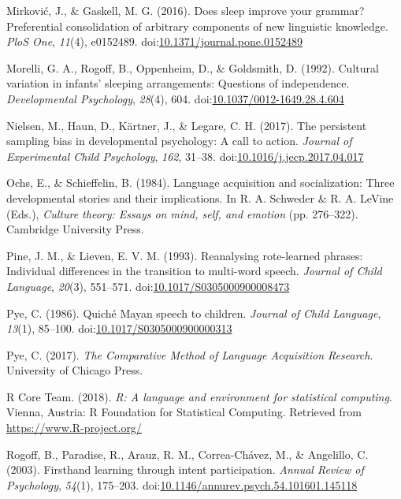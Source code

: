 \documentclass[floatsintext,man]{apa6}
\theoremstyle{definition}
\theoremstyle{definition}
\theoremstyle{definition}
\theoremstyle{remark}
\begin{document}
\hypertarget{ref-mirkovic2016does}{}
Mirković, J., \& Gaskell, M. G. (2016). Does sleep improve your grammar?
Preferential consolidation of arbitrary components of new linguistic
knowledge. \emph{PloS One}, \emph{11}(4), e0152489.
doi:\href{https://doi.org/10.1371/journal.pone.0152489}{10.1371/journal.pone.0152489}

\hypertarget{ref-morelli1992cultural}{}
Morelli, G. A., Rogoff, B., Oppenheim, D., \& Goldsmith, D. (1992).
Cultural variation in infants' sleeping arrangements: Questions of
independence. \emph{Developmental Psychology}, \emph{28}(4), 604.
doi:\href{https://doi.org/10.1037/0012-1649.28.4.604}{10.1037/0012-1649.28.4.604}

\hypertarget{ref-nielsen2017persistent}{}
Nielsen, M., Haun, D., Kärtner, J., \& Legare, C. H. (2017). The
persistent sampling bias in developmental psychology: A call to action.
\emph{Journal of Experimental Child Psychology}, \emph{162}, 31--38.
doi:\href{https://doi.org/10.1016/j.jecp.2017.04.017}{10.1016/j.jecp.2017.04.017}

\hypertarget{ref-ochs1984language}{}
Ochs, E., \& Schieffelin, B. (1984). Language acquisition and
socialization: Three developmental stories and their implications. In R.
A. Schweder \& R. A. LeVine (Eds.), \emph{Culture theory: Essays on
mind, self, and emotion} (pp. 276--322). Cambridge University Press.

\hypertarget{ref-pine1993reanalysing}{}
Pine, J. M., \& Lieven, E. V. M. (1993). Reanalysing rote-learned
phrases: Individual differences in the transition to multi-word speech.
\emph{Journal of Child Language}, \emph{20}(3), 551--571.
doi:\href{https://doi.org/10.1017/S0305000900008473}{10.1017/S0305000900008473}

\hypertarget{ref-pye1986quiche}{}
Pye, C. (1986). Quiché Mayan speech to children. \emph{Journal of Child
Language}, \emph{13}(1), 85--100.
doi:\href{https://doi.org/10.1017/S0305000900000313}{10.1017/S0305000900000313}

\hypertarget{ref-pye2017comparative}{}
Pye, C. (2017). \emph{The Comparative Method of Language Acquisition
Research}. University of Chicago Press.

\hypertarget{ref-R-base}{}
R Core Team. (2018). \emph{R: A language and environment for statistical
computing}. Vienna, Austria: R Foundation for Statistical Computing.
Retrieved from \url{https://www.R-project.org/}

\hypertarget{ref-rogoff2003firsthand}{}
Rogoff, B., Paradise, R., Arauz, R. M., Correa-Chávez, M., \& Angelillo,
C. (2003). Firsthand learning through intent participation. \emph{Annual
Review of Psychology}, \emph{54}(1), 175--203.
doi:\href{https://doi.org/10.1146/annurev.psych.54.101601.145118}{10.1146/annurev.psych.54.101601.145118}
\end{document}
